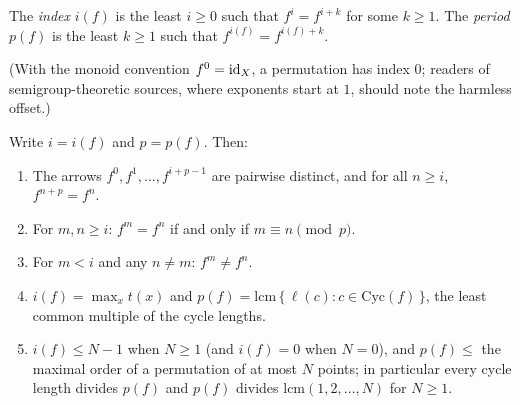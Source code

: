 \begin{definition}
\label{ch05:def:indexperiod}
The \emph{index} $i(f)$ is the least $i \ge 0$ such that $f^{i} = f^{i + k}$
for some $k \ge 1$. The \emph{period} $p(f)$ is the least $k \ge 1$ such
that $f^{i(f)} = f^{i(f) + k}$.
\end{definition}

(With the monoid convention $f^{0} = \mathrm{id}_X$, a permutation has index $0$;
readers of semigroup-theoretic sources, where exponents start at $1$, should
note the harmless offset.)

\begin{proposition}
\label{ch05:prop:powerseq}
Write $i = i(f)$ and $p = p(f)$. Then:
\begin{enumerate}
\item The arrows $f^{0}, f^{1}, \dots, f^{i + p - 1}$ are pairwise
distinct, and for all $n \ge i$, $f^{n + p} = f^{n}$.
\item For $m, n \ge i$: $f^{m} = f^{n}$ if and only if
$m \equiv n \pmod{p}$.
\item For $m < i$ and any $n \ne m$: $f^{m} \ne f^{n}$.
\item $i(f) = \max_{x} t(x)$ and $p(f) = \mathrm{lcm}\,
\{\, \ell(c) : c \in \mathrm{Cyc}(f) \,\}$, the least common multiple of
the cycle lengths.
\item $i(f) \le N - 1$ when $N \ge 1$ (and $i(f) = 0$ when $N = 0$), and
$p(f) \le$ the maximal order of a permutation of at most $N$ points; in
particular every cycle length divides $p(f)$ and $p(f)$ divides
$\mathrm{lcm}(1, 2, \dots, N)$ for $N \ge 1$.
\end{enumerate}
\end{proposition}

